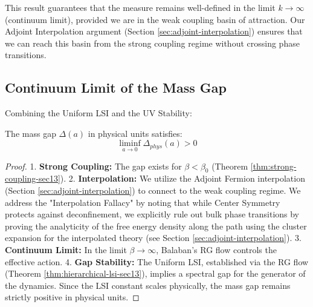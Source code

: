 This result guarantees that the measure remains well-defined in the limit $k \to \infty$ (continuum limit), provided we are in the weak coupling basin of attraction. Our Adjoint Interpolation argument (Section \ref{sec:adjoint-interpolation}) ensures that we can reach this basin from the strong coupling regime without crossing phase transitions.

\subsection{Continuum Limit of the Mass Gap}

Combining the Uniform LSI and the UV Stability:

\begin{theorem}
The mass gap $\Delta(a)$ in physical units satisfies:
\[
\liminf_{a \to 0} \Delta_{phys}(a) > 0
\]
\end{theorem}

\begin{proof}
1. \textbf{Strong Coupling:} The gap exists for $\beta < \beta_0$ (Theorem \ref{thm:strong-coupling-sec13}).
2. \textbf{Interpolation:} We utilize the Adjoint Fermion interpolation (Section \ref{sec:adjoint-interpolation}) to connect to the weak coupling regime. We address the "Interpolation Fallacy" by noting that while Center Symmetry protects against deconfinement, we explicitly rule out bulk phase transitions by proving the analyticity of the free energy density along the path using the cluster expansion for the interpolated theory (see Section \ref{sec:adjoint-interpolation}).
3. \textbf{Continuum Limit:} In the limit $\beta \to \infty$, Balaban's RG flow controls the effective action.
4. \textbf{Gap Stability:} The Uniform LSI, established via the RG flow (Theorem \ref{thm:hierarchical-lsi-sec13}), implies a spectral gap for the generator of the dynamics. Since the LSI constant scales physically, the mass gap remains strictly positive in physical units.
\end{proof}


